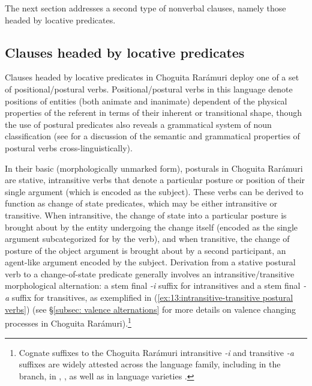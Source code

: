 The next section addresses a second type of nonverbal clauses, namely those headed by locative predicates.

\subsection{Clauses headed by locative predicates}
\label{subsec: locative clauses}

Clauses headed by locative predicates in Choguita Rarámuri deploy one of a set of positional/postural verbs. Positional/postural verbs in this language denote positions of entities (both animate and inanimate) dependent of the physical properties of the referent in terms of their inherent or transitional shape, though the use of postural predicates also reveals a grammatical system of noun classification (see \citealt{ameka2007introduction} for a discussion of the semantic and grammatical properties of postural verbs cross-linguistically).

In their basic (morphologically unmarked form), posturals in Choguita Rarámuri are stative, intransitive verbs that denote a particular posture or position of their single argument (which is encoded as the subject). These verbs can be derived to function as change of state predicates, which may be either intransitive or transitive. When intransitive, the change of state into a particular posture is brought about by the entity undergoing the change itself (encoded as the single argument subcategorized for by the verb), and when transitive, the change of posture of the object argument is brought about by a second participant, an agent-like argument encoded by the subject. Derivation from a stative postural verb to a change-of-state predicate generally involves an intransitive/transitive morphological alternation: a stem final \textit{{}-i} suffix for intransitives and a stem final \textit{-a} suffix for transitives, as exemplified in (\ref{ex:13:intransitive-transitive postural verbs}) (see §\ref{subsec: valence alternations} for more details on valence changing processes in Choguita Rarámuri).\footnote{Cognate suffixes to the Choguita Rarámuri intransitive \textit{-i} and transitive \textit{-a} suffixes are widely attested across the  language family, including in the  branch, in , , as well as in  language varieties \citep[32]{heath1977uto}.}

\ea\label{ex:13:intransitive-transitive postural verbs}

    \z
\z

